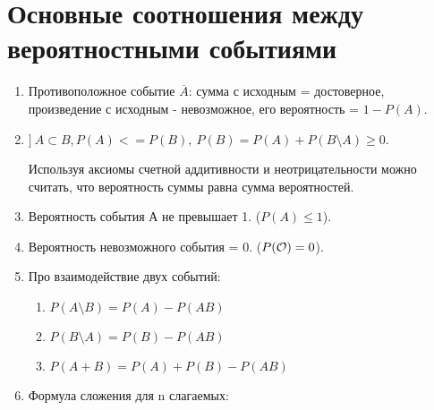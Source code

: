 \documentclass[../Main.tex]{subfiles}
\begin{document}
\section{Основные соотношения между вероятностными событиями}
\begin{enumerate}
    \item Противоположное событие \(\overline A\): сумма с исходным = достоверное, произведение с исходным - невозможное, его вероятность = \(1 - P(A)\). 
    
    \item \(]\ A \subset B, P(A) <= P(B),\ P(B) = P(A) + P(B \setminus A) \geq 0 \).
    
    Используя аксиомы счетной аддитивности и неотрицательности можно считать, что вероятность суммы равна сумма вероятностей.
    \item Вероятность события А не превышает 1. (\(P(A) \leq 1\)).

    \item Вероятность невозможного события = 0. (\(P(\mathcal O) = 0\)).

    \item Про взаимодействие двух событий:
        \begin{enumerate}
            \item \(P(A \setminus B) = P(A) - P(AB)\)
            \item \(P(B \setminus A) = P(B) - P(AB)\)
            \item \(P(A+B)=P(A)+P(B) - P(AB)\)
        \end{enumerate}
    \item Формула сложения для n слагаемых: 
    

\end{enumerate}
\end{document}

